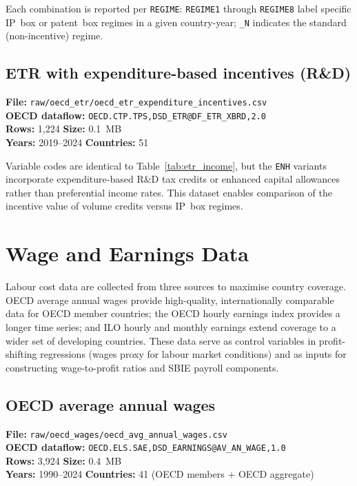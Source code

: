 \documentclass[11pt,a4paper]{article}
\begin{document}
Each combination is reported per \texttt{REGIME}: \texttt{REGIME1} through \texttt{REGIME8} label specific IP~box or patent~box regimes in a given country-year; \texttt{\_N} indicates the standard (non-incentive) regime.

\subsection{ETR with expenditure-based incentives (R\&D)}

\textbf{File:} \texttt{raw/oecd\_etr/oecd\_etr\_expenditure\_incentives.csv}\\
\textbf{OECD dataflow:} \texttt{OECD.CTP.TPS,DSD\_ETR@DF\_ETR\_XBRD,2.0}\\
\textbf{Rows:} 1{,}224 \quad \textbf{Size:} 0.1~MB\\
\textbf{Years:} 2019--2024 \quad \textbf{Countries:} 51

Variable codes are identical to Table~\ref{tab:etr_income}, but the \texttt{ENH} variants incorporate expenditure-based R\&D tax credits or enhanced capital allowances rather than preferential income rates.  This dataset enables comparison of the incentive value of volume credits versus IP~box regimes.


\section{Wage and Earnings Data}\label{sec:wages}

Labour cost data are collected from three sources to maximise country coverage.
OECD average annual wages provide high-quality, internationally comparable data
for OECD member countries; the OECD hourly earnings index provides a longer
time series; and ILO hourly and monthly earnings extend coverage to a wider set
of developing countries.  These data serve as control variables in
profit-shifting regressions (wages proxy for labour market conditions) and as
inputs for constructing wage-to-profit ratios and SBIE payroll components.

\subsection{OECD average annual wages}

\textbf{File:} \texttt{raw/oecd\_wages/oecd\_avg\_annual\_wages.csv}\\
\textbf{OECD dataflow:} \texttt{OECD.ELS.SAE,DSD\_EARNINGS@AV\_AN\_WAGE,1.0}\\
\textbf{Rows:} 3{,}924 \quad \textbf{Size:} 0.4~MB\\
\textbf{Years:} 1990--2024 \quad \textbf{Countries:} 41 (OECD members + OECD aggregate)
\end{document}
